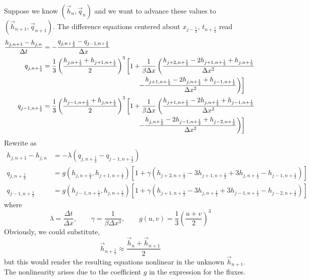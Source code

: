 \documentclass[12pt]{article}
\numberwithin{equation}{section}
\begin{document}
Suppose we know  $(\vec{h}_n,\vec{q}_n)$ and we want to advance these values to  $(\vec{h}_{n+1},\vec{q}_{n+1})$. The difference equations centered about $x_{j-\frac{1}{2}}$, $t_{n+\frac{1}{2}}$ read
\begin{align}
	\frac{h_{j, {n+1}}-h_{j,n}}{\Delta t}
	&=
	- \frac{q_{j,n+\frac{1}{2}}-q_{j-1,n+\frac{1}{2}}}{\Delta x}
	\\
	q_{j,n+\frac{1}{2}}
	&=
	\frac{1}{3} \left(
		\frac{h_{j,n+\frac{1}{2}}+h_{j+1,n+\frac{1}{2}}}{2}
	\right)^3
	\left[
		1 + \frac{1}{\beta \Delta x} \left(
			\frac{h_{j+2,n+\frac{1}{2}} - 2 h_{j+1,n+\frac{1}{2}}+ h_{j,n+\frac{1}{2}}}{\Delta x^2}
	\right.
	\right.
	\nonumber \\ &\hphantom{=\frac{1}{3} \left(
		\frac{h_{j,n+\frac{1}{2}}+h_{j+1,n+\frac{1}{2}}}{2}
	\right)^3
	\bigg[1+}
	\left.
	\left.
			-
			\frac{h_{j+1,n+\frac{1}{2}} - 2 h_{j,n+\frac{1}{2}}+ h_{j-1,n+\frac{1}{2}}}{\Delta x^2}
		\right)
	\right]
	\\
	q_{j-1,n+\frac{1}{2}}
	&=
	\frac{1}{3} \left(
		\frac{h_{j-1,n+\frac{1}{2}}+h_{j,n+\frac{1}{2}}}{2}
	\right)^3
	\left[
		1 + \frac{1}{\beta \Delta x} \left(
			\frac{h_{j+1,n+\frac{1}{2}} - 2 h_{j,n+\frac{1}{2}}+ h_{j-1,n+\frac{1}{2}}}{\Delta x^2}
	\right.
	\right.
	\nonumber \\ &\hphantom{=\frac{1}{3} \left(
		\frac{h_{j,n+\frac{1}{2}}+h_{j+1,n+\frac{1}{2}}}{2}
	\right)^3
	\bigg[1+}
	\left.
	\left.
			-
			\frac{h_{j,n+\frac{1}{2}} - 2 h_{j-1,n+\frac{1}{2}}+ h_{j-2,n+\frac{1}{2}}}{\Delta x^2}
		\right)
	\right]
\end{align}
Rewrite as
\begin{align}
	h_{j, {n+1}}-h_{j,n}
	&=
	- \lambda (q_{j,n+\frac{1}{2}}-q_{j-1,n+\frac{1}{2}})
	\\
	q_{j,n+\frac{1}{2}}
	&=
	g(h_{j,n+\frac{1}{2}}, h_{j+1,n+\frac{1}{2}})
	[
		1 + \gamma (
			h_{j+2,n+\frac{1}{2}} - 3 h_{j+1,n+\frac{1}{2}}+3 h_{j,n+\frac{1}{2}} -  h_{j-1,n+\frac{1}{2}})
	]
	\\
	q_{j-1,n+\frac{1}{2}}
	&=
	g(h_{j-1,n+\frac{1}{2}}, h_{j,n+\frac{1}{2}})
	[
		1 + \gamma (
			h_{j+1,n+\frac{1}{2}} - 3 h_{j,n+\frac{1}{2}}+ 3h_{j-1,n+\frac{1}{2}} - h_{j-2,n+\frac{1}{2}})
	]
\end{align}
where
\[
	\lambda = \frac{\Delta t}{\Delta x}, \qquad
	\gamma = \frac{1}{\beta \Delta x^3}, \qquad
	g(u,v) = \frac{1}{3} \left( \frac{u + v}{2}\right)^3
\]
Obviously, we could substitute,
\[
	\vec{h}_{n+\frac{1}{2}} \approx \frac{\vec{h}_{n} + \vec{h}_{n+1}}{2} 
\]
but this would render the resulting equations nonlinear in the unknown $\vec{h}_{n+1}$. 
The nonlinearity arises due to the coefficient $g$ in the expression for the fluxes. 
\end{document}
